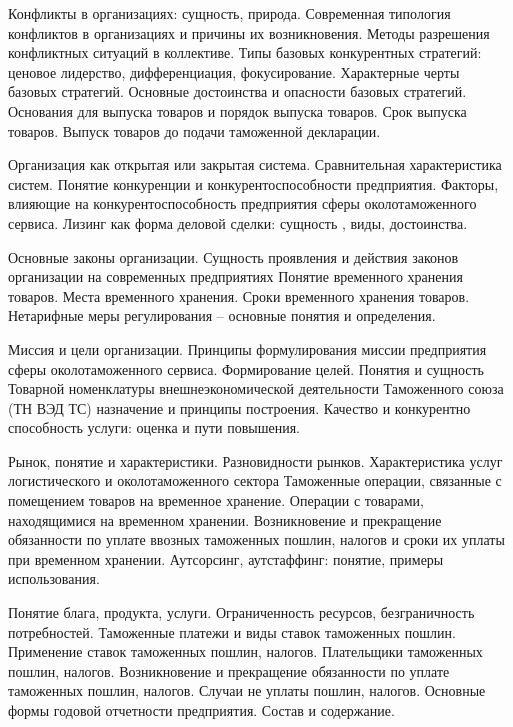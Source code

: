 \documentclass[
	11pt,
	a4paper,
	]
	{article}
\begin{document}
\bigskip

\noindent{} 
	{
		Конфликты в организациях: сущность, природа. Современная типология конфликтов в организациях и причины их возникновения. Методы разрешения конфликтных ситуаций в коллективе.
	}{
		Типы базовых конкурентных стратегий: ценовое лидерство, дифференциация, фокусирование. Характерные черты базовых стратегий. Основные достоинства и опасности базовых стратегий.
	}{
		Основания для выпуска товаров и порядок выпуска товаров. Срок выпуска товаров. Выпуск товаров до подачи таможенной декларации.
	}

\bigskip

\noindent{} 
	{
		Организация как открытая или закрытая система. Сравнительная характеристика систем.
	}{
		Понятие конкуренции и конкурентоспособности предприятия. Факторы, влияющие на конкурентоспособность предприятия сферы околотаможенного сервиса.
	}{
		Лизинг как форма деловой сделки: сущность , виды, достоинства.
	}

\bigskip

\noindent{} 
	{
		Основные законы организации. Сущность проявления и действия законов организации на современных предприятиях
	}{
		Понятие временного хранения товаров. Места временного хранения. Сроки временного хранения товаров.
	}{
		Нетарифные меры регулирования – основные понятия и определения.
	}

\bigskip

\noindent{} 
	{
		Миссия и цели организации. Принципы формулирования миссии предприятия сферы околотаможенного сервиса. Формирование целей.
	}{
		Понятия и сущность Товарной номенклатуры внешнеэкономической деятельности Таможенного союза (ТН ВЭД ТС) назначение и принципы построения.
	}{
		Качество и конкурентно способность услуги: оценка и пути повышения.
	}

\bigskip

\noindent{} 
	{
		Рынок, понятие и характеристики. Разновидности рынков. Характеристика услуг логистического и околотаможенного сектора
	}{
		Таможенные операции, связанные с помещением товаров на временное хранение. Операции с товарами, находящимися на временном хранении. Возникновение и прекращение обязанности по уплате ввозных таможенных пошлин, налогов и сроки их уплаты при временном хранении.
	}{
		Аутсорсинг, аутстаффинг: понятие, примеры использования.
	}

\bigskip

\noindent{} 
	{
		Понятие блага, продукта, услуги. Ограниченность ресурсов, безграничность потребностей.
	}{
		Таможенные платежи и виды ставок таможенных пошлин. Применение ставок таможенных пошлин, налогов. Плательщики таможенных пошлин, налогов. Возникновение и прекращение обязанности по уплате таможенных пошлин, налогов. Случаи не уплаты пошлин, налогов.
	}{
		Основные формы годовой отчетности предприятия. Состав и содержание.
	}
\end{document}
